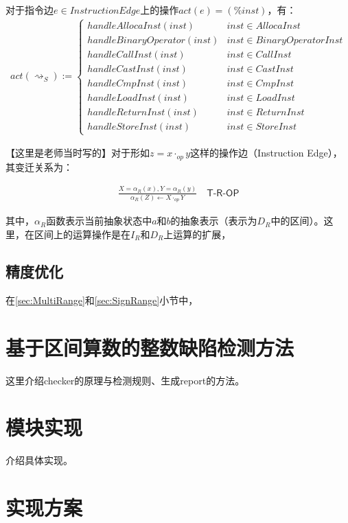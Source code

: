对于指令边$ e \in InstructionEdge $上的操作$ act(e) = (\%inst) $，有：
\begin{align}
	act(\rightsquigarrow_S) := \begin{cases}
		handleAllocaInst(inst) & inst \in AllocaInst\\
		handleBinaryOperator(inst) & inst \in BinaryOperatorInst\\
		handleCallInst(inst) & inst \in CallInst\\
		handleCastInst(inst) & inst \in CastInst\\
		handleCmpInst(inst) & inst \in CmpInst\\
		handleLoadInst(inst) & inst \in LoadInst\\
		handleReturnInst(inst) & inst \in ReturnInst\\
		handleStoreInst(inst) & inst \in StoreInst
	\end{cases}
\end{align}
{\color{orange}
【这里是老师当时写的】对于形如$ z = x \cdot_{op}  y$这样的操作边（Instruction Edge），其变迁关系为：

\begin{align}
\frac{X=\alpha_R(x), Y=\alpha_R(y)}{\alpha_R(Z) \leftarrow X \cdot_{op}Y} \quad\textsf{T-R-OP}
\end{align}

其中，$ \alpha_R $函数表示当前抽象状态中$ a $和$ b $的抽象表示（表示为$ D_R $中的区间）。这里，在区间上的运算操作是在$ I_R $和$ D_R $上运算的扩展，
}
\subsection{精度优化}

在\ref{sec:MultiRange}和\ref{sec:SignRange}小节中，

\section{基于区间算数的整数缺陷检测方法}

这里介绍checker的原理与检测规则、生成report的方法。

\section{模块实现}

介绍具体实现。

\section{实现方案} 

